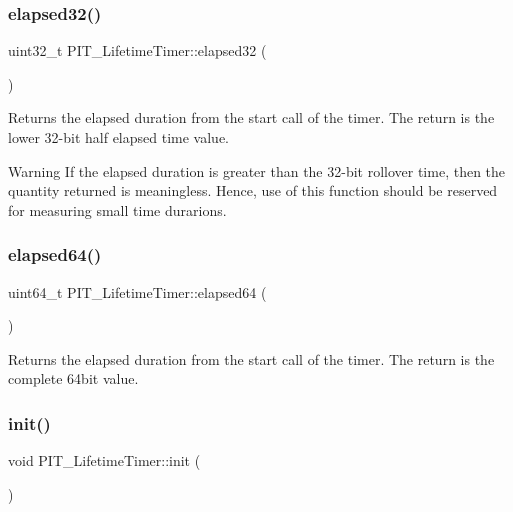 \subsubsection{\texorpdfstring{elapsed32()}{elapsed32()}}
{\footnotesize\ttfamily uint32\+\_\+t P\+I\+T\+\_\+\+Lifetime\+Timer\+::elapsed32 (\begin{DoxyParamCaption}{ }\end{DoxyParamCaption})\hspace{0.3cm}{\ttfamily [inline]}}



Returns the elapsed duration from the start call of the timer. The return is the lower 32-\/bit half elapsed time value. 

\begin{DoxyWarning}{Warning}
If the elapsed duration is greater than the 32-\/bit rollover time, then the quantity returned is meaningless. Hence, use of this function should be reserved for measuring small time durarions. 
\end{DoxyWarning}
\mbox{\label{classPIT__LifetimeTimer_a04adf2272a47d4c81a28c6363e2da4fd}} 
\subsubsection{\texorpdfstring{elapsed64()}{elapsed64()}}
{\footnotesize\ttfamily uint64\+\_\+t P\+I\+T\+\_\+\+Lifetime\+Timer\+::elapsed64 (\begin{DoxyParamCaption}{ }\end{DoxyParamCaption})\hspace{0.3cm}{\ttfamily [inline]}}



Returns the elapsed duration from the start call of the timer. The return is the complete 64bit value. 

\mbox{\label{classPIT__LifetimeTimer_ad1c585d138123be94769afcca87f2dc6}} 
\subsubsection{\texorpdfstring{init()}{init()}}
{\footnotesize\ttfamily void P\+I\+T\+\_\+\+Lifetime\+Timer\+::init (\begin{DoxyParamCaption}{ }\end{DoxyParamCaption})\hspace{0.3cm}{\ttfamily [inline]}}



